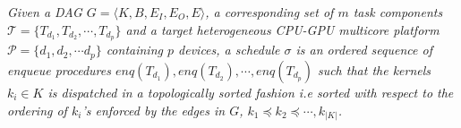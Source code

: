 	\begin{definition}\emph{
		Given a DAG $G = \langle K,B,E_I,E_O,E \rangle$,  a corresponding set of $m$ task components $\mathcal{T} = \lbrace T_{d_1}, T_{d_2}, \cdots, T_{d_p}\rbrace$ and a target heterogeneous CPU-GPU multicore platform $\mathcal{P} = \{d_1,d_2,\cdots d_p \}$ containing $p$ devices, a schedule $\sigma$ is an ordered sequence of enqueue procedures $enq(T_{d_1}), enq(T_{d_2}),\cdots,enq(T_{d_p})$ such that the kernels $k_i \in K$ is dispatched in a topologically sorted fashion i.e sorted with respect to the ordering of $k_i$'s enforced by the edges in $G$,  $k_1 \preceq k_2 \preceq \cdots, k_{|K|}$. } 
	\end{definition}
	